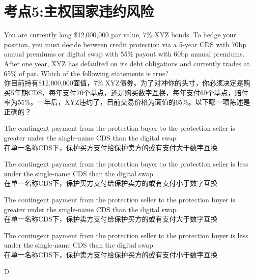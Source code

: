 \documentclass{article}
\newcounter{question} %
\begin{document}
\newpage


\section{考点5:主权国家违约风险}
\setcounter{question}{0}


\begin{question}
    You are currently long \$12,000,000 par value, 7\% XYZ bonds. To hedge your position, you must decide between credit protection via a 5-year CDS with 70bp annual premiums or digital swap with 55\% payout with 60bp annual premiums. After one year, XYZ has defaulted on its debt obligations and currently trades at 65\% of par. Which of the following statements is true?
    \\ 你目前持有\$12,000,000面值，7\% XYZ债券。为了对冲你的头寸，你必须决定是购买5年期CDS，每年支付70个基点，还是购买数字互换，每年支付60个基点，赔付率为55\%。一年后，XYZ违约了，目前交易价格为面值的65\%。以下哪一项陈述是正确的？
\end{question}

\begin{choices}
    \item The contingent payment from the protection buyer to the protection seller is greater under the single-name CDS than the digital swap
    \\ 在单一名称CDS下，保护买方支付给保护卖方的或有支付大于数字互换
    \item The contingent payment from the protection buyer to the protection seller is less under the single-name CDS than the digital swap
    \\ 在单一名称CDS下，保护买方支付给保护卖方的或有支付小于数字互换
    \item The contingent payment from the protection seller to the protection buyer is greater under the single-name CDS than the digital swap
    \\ 在单一名称CDS下，保护卖方支付给保护买方的或有支付大于数字互换
    \item The contingent payment from the protection seller to the protection buyer is less under the single-name CDS than the digital swap
    \\ 在单一名称CDS下，保护卖方支付给保护买方的或有支付小于数字互换
\end{choices}

\begin{correctanswer}
    D
\end{correctanswer}
\end{document}
